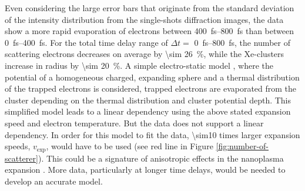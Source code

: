 Even considering the large error bars that originate from the standard deviation of the intensity distribution from the single-shots diffraction images, the data show a more rapid evaporation of electrons between \SIrange{400}{800}{\femto\second} than between \SIrange{0}{400}{\femto\second}. For the total time delay range of $\Delta t=$ \SIrange{0}{800}{\femto\second}, the number of scattering electrons decreases on average by \SI{\sim 26}{\percent}, while the Xe-clusters increase in radius by \SI{\sim 20}{\percent}. A simple electro-static model \cite{Arbeiter-2010-PRA,Ditmire-1996-PRA}, where the potential of a homogeneous charged, expanding sphere and a thermal distribution of the trapped electrons is considered, trapped electrons are evaporated from the cluster depending on the thermal distribution and cluster potential depth. This simplified model leads to a linear dependency using the above stated expansion speed and electron temperature. But the data does not support a linear dependency. In order for this model to fit the data, \num{\sim10} times larger expansion speeds, $v_{\text{exp}}$, would have to be used (see red line in Figure \ref{fig:number-of-scatterer}). This could be a signature of anisotropic effects in the nanoplasma expansion \cite{Peltz-2014-PRL,Mikaberidze-2009-PRL}. More data, particularly at longer time delays, would be needed to develop an accurate model.\\[1\baselineskip]
%
